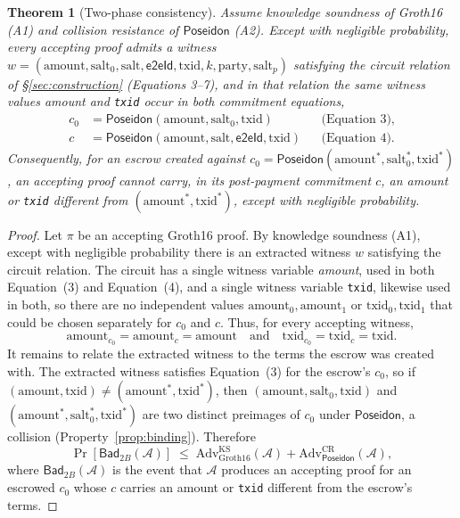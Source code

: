 \documentclass[11pt]{article}
\newtheorem{theorem}{Theorem}
\newcommand{\Poseidon}{\ensuremath{\mathsf{Poseidon}}}
\newcommand{\eeid}{\ensuremath{\mathsf{e2eId}}}
\newcommand{\code}[1]{\texttt{#1}}
\begin{document}
\begin{theorem}[Two-phase consistency]
\label{thm:twophase}
Assume knowledge soundness of Groth16 (A1) and collision resistance of
$\Poseidon$ (A2). Except with negligible probability, every accepting proof
admits a witness
$w=(\text{amount},\allowbreak\text{salt}_0,\allowbreak\text{salt},\allowbreak\eeid,\allowbreak\text{txid},\allowbreak k,\allowbreak\text{party},\allowbreak\text{salt}_p)$
satisfying the circuit relation of \S\ref{sec:construction} (Equations
3--7), and in that relation the same witness values \emph{amount} and
\code{txid} occur in both commitment equations,
\[
\begin{aligned}
c_0 &= \Poseidon(\text{amount},\text{salt}_0,\text{txid}) &&\text{(Equation~3)},\\
c   &= \Poseidon(\text{amount},\text{salt},\eeid,\text{txid}) &&\text{(Equation~4)}.
\end{aligned}
\]
Consequently, for an escrow created against
$c_0=\Poseidon(\text{amount}^*,\text{salt}_0^*,\text{txid}^*)$, an accepting proof
cannot carry, in its post-payment commitment $c$, an amount or \code{txid}
different from $(\text{amount}^*,\text{txid}^*)$, except with negligible
probability.
\end{theorem}

\begin{proof}
Let $\pi$ be an accepting Groth16 proof. By knowledge soundness (A1), except
with negligible probability there is an extracted witness $w$ satisfying the
circuit relation. The circuit has a single witness variable \emph{amount}, used
in both Equation~(3) and Equation~(4), and a single witness variable
\code{txid}, likewise used in both, so there are no independent values
$\text{amount}_0,\text{amount}_1$ or $\text{txid}_0,\text{txid}_1$ that could be
chosen separately for $c_0$ and $c$. Thus, for every accepting witness,
\[
\text{amount}_{c_0}=\text{amount}_c=\text{amount}
\quad\text{and}\quad
\text{txid}_{c_0}=\text{txid}_c=\text{txid}.
\]
It remains to relate the extracted witness to the terms the escrow was created
with. The extracted witness satisfies Equation~(3) for the escrow's $c_0$, so if
$(\text{amount},\text{txid})\neq(\text{amount}^*,\text{txid}^*)$, then
$(\text{amount},\text{salt}_0,\text{txid})$ and
$(\text{amount}^*,\text{salt}_0^*,\text{txid}^*)$ are two distinct preimages of
$c_0$ under $\Poseidon$, a collision (Property~\ref{prop:binding}). Therefore
\begin{equation}
\Pr[\mathsf{Bad}_{2B}(\mathcal{A})]
\;\leq\;
\mathrm{Adv}^{\mathrm{KS}}_{\mathrm{Groth16}}(\mathcal{A})
+\mathrm{Adv}^{\mathrm{CR}}_{\Poseidon}(\mathcal{A}),
\end{equation}
where $\mathsf{Bad}_{2B}(\mathcal{A})$ is the event that $\mathcal{A}$ produces
an accepting proof for an escrowed $c_0$ whose $c$ carries an amount or
\code{txid} different from the escrow's terms.
\end{proof}
\end{document}
